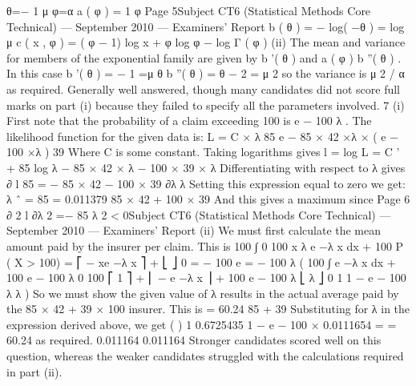 θ=−
1
μ
φ=α
a ( φ ) =
1
φ
Page 5Subject CT6 (Statistical Methods Core Technical) — September 2010 — Examiners’ Report
b ( θ ) = − log( −θ ) = log μ
c ( x , φ ) = ( φ − 1) log x + φ log φ − log Γ ( φ )
(ii)
The mean and variance for members of the exponential family are given by
b '( θ ) and a ( φ ) b ''( θ ) .
In this case b '( θ ) = −
1
=μ
θ
b ''( θ ) = θ − 2 = μ 2 so the variance is μ 2 / α as required.
Generally well answered, though many candidates did not score full marks on part (i)
because they failed to specify all the parameters involved.
7
(i)
First note that the probability of a claim exceeding 100 is e − 100 λ .
The likelihood function for the given data is:
L = C × λ 85 e − 85 × 42 ×λ × ( e − 100 ×λ ) 39
Where C is some constant. Taking logarithms gives
l = log L = C ' + 85 log λ − 85 × 42 × λ − 100 × 39 × λ
Differentiating with respect to λ gives
∂ l 85
=
− 85 × 42 − 100 × 39
∂λ λ
Setting this expression equal to zero we get:
λ ˆ =
85
= 0.011379
85 × 42 + 100 × 39
And this gives a maximum since
Page 6
∂ 2 l
∂λ
2
=−
85
λ 2
< 0Subject CT6 (Statistical Methods Core Technical) — September 2010 — Examiners’ Report
(ii)
We must first calculate the mean amount paid by the insurer per claim. This is
100
∫
0
100
x λ e −λ x dx + 100 P ( X > 100) = ⎡ − xe −λ x ⎤ +
⎣
⎦ 0
= − 100 e
=
− 100 λ
(
100
∫ e
−λ x
dx + 100 e − 100 λ
0
100
⎡ 1
⎤
+ ⎢ − e −λ x ⎥ + 100 e − 100 λ
⎣ λ
⎦ 0
1
1 − e − 100 λ
λ
)
So we must show the given value of λ results in the actual average paid by the
85 × 42 + 39 × 100
insurer. This is
= 60.24
85 + 39
Substituting for λ in the expression derived above, we get
(
)
1
0.6725435
1 − e − 100 × 0.0111654 =
= 60.24 as required.
0.011164
0.011164
Stronger candidates scored well on this question, whereas the weaker candidates struggled
with the calculations required in part (ii).
